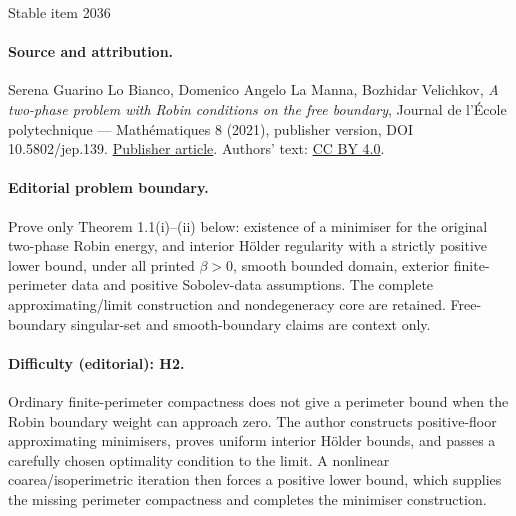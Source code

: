 \documentclass[11pt]{article}
\numberwithin{equation}{section}
\begin{document}
\begin{center}{\Large Stable item 2036}\end{center}
\paragraph{Source and attribution.}
Serena Guarino Lo Bianco, Domenico Angelo La Manna, Bozhidar Velichkov, \emph{A two-phase problem with Robin conditions on the free boundary}, Journal de l’École polytechnique — Mathématiques 8 (2021), publisher version, DOI 10.5802/jep.139. \href{https://jep.centre-mersenne.org/articles/10.5802/jep.139/}{Publisher article}. Authors' text: \href{https://creativecommons.org/licenses/by/4.0/}{CC BY 4.0}.
\paragraph{Editorial problem boundary.}
Prove only Theorem 1.1(i)--(ii) below: existence of a minimiser for the original two-phase Robin energy, and interior Hölder regularity with a strictly positive lower bound, under all printed \(\beta>0\), smooth bounded domain, exterior finite-perimeter data and positive Sobolev-data assumptions. The complete approximating/limit construction and nondegeneracy core are retained. Free-boundary singular-set and smooth-boundary claims are context only.
\paragraph{Difficulty (editorial): H2.}
Ordinary finite-perimeter compactness does not give a perimeter bound when the Robin boundary weight can approach zero. The author constructs positive-floor approximating minimisers, proves uniform interior Hölder bounds, and passes a carefully chosen optimality condition to the limit. A nonlinear coarea/isoperimetric iteration then forces a positive lower bound, which supplies the missing perimeter compactness and completes the minimiser construction.
\end{document}
